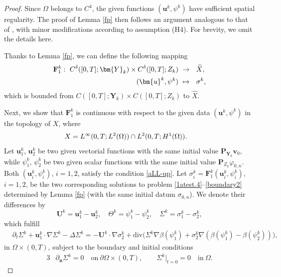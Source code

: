 \documentclass[11pt,reqno]{amsart}
\begin{document}
\begin{proof}
Since $\Omega$ belongs to $C^4$, the given functions $(\bm{u}^k,\psi^k)$ have sufficient spatial regularity. The proof of Lemma \ref{fp} then follows an argument analogous to that of \cite[Lemma 3.1]{GHW1}, with minor modifications according to assumption (H4). For brevity, we omit the details here.

Thanks to Lemma \ref{fp}, we can define the following mapping
%
\begin{align}
\mathbf{F}^k_{1}:\  C^\delta([0,T];\bm{Y}_{k})\times C^\delta([0,T];Z_{k}) \ &\to\ \  \widehat{X}, \notag\\
(\bm{u}^{k},\psi^{k})\ &\mapsto\ \ \sigma^{k},\notag
\end{align}
%
which is bounded from $C([0,T];\bm{Y}_{k})\times C([0,T];Z_{k})$ to $\widehat{X}$.


Next, we show that $\mathbf{F}^k_{1}$ is continuous with respect to the given data $(\bm{u}^{k},\psi^{k})$ in the topology of $X$, where
%
\begin{align}
X&= L^{\infty}(0,T;L^2(\Omega)) \cap  L^{2}(0,T;H^1(\Omega)).
\notag
\end{align}
Let $\bm{u}^{k}_{1}$, $\bm{u}^{k}_{2}$ be two given vectorial functions with the same initial value $\bm{P}_{\bm{Y}_{k}} \bm{v}_{0}$, while $\psi^{k}_{1}$, $\psi^{k}_{2}$ be two given scalar functions with the same initial value $\bm{P}_{Z_{k}}\varphi_{0,n}$. Both $(\bm{u}^{k}_{i},\psi^{k}_{i})$, $i=1,2$, satisfy the condition \eqref{aLL-up}.
Let $\sigma^{k}_{i} =\mathbf{F}^k_{1}(\bm{u}^{k}_{i},\psi^{k}_i)$, $i=1,2$, be the two corresponding solutions to problem \eqref{1atest.4}--\eqref{boundary2} determined by Lemma \ref{fp} (with the same initial datum $\sigma_{0,n}$).
We denote their differences by
$$
\bm{U}^k= \bm{u}^k_1-\bm{u}^k_2,\quad \Theta^{k}=\psi_{1}^{k}-\psi_{2}^{k},\quad \Sigma^{k}=\sigma_{1}^{k}-\sigma_{2}^{k},
$$
which fulfill
%
\begin{align}
	&\partial_t  \Sigma^{k} +{\bm{u}^k_1 \cdot \nabla \Sigma^k} -\Delta \Sigma^k
	  =  -\bm{U}^k \cdot \nabla \sigma^k_2
        + \mathrm{div}\big(\Sigma^k \nabla \beta(\psi_{1}^k)+\sigma_{2}^k \nabla (\beta(\psi_1^k)-\beta(\psi_2^k))\big),
\label{2atest.3}
\end{align}
%
in $\Omega\times (0,T)$, subject to the boundary and initial conditions
%
\begin{alignat}{3}
&\partial_{\boldsymbol{n}} \Sigma^k =0  \quad \text{on}\ \partial\Omega\times(0,T),
\qquad \Sigma^{k}|_{t=0}=0 \quad \text{in}\ \Omega.
\label{boundary3}
\end{alignat}

\end{proof}
\end{document}
